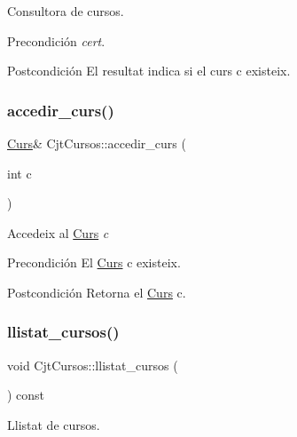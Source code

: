 Consultora de cursos. 

\begin{DoxyPrecond}{Precondición}
{\itshape cert}. 
\end{DoxyPrecond}
\begin{DoxyPostcond}{Postcondición}
El resultat indica si el curs c existeix. 
\end{DoxyPostcond}
\mbox{\label{class_cjt_cursos_aaff9556e6d0f2b55e74fb757ffd51e42}} 
\subsubsection{\texorpdfstring{accedir\+\_\+curs()}{accedir\_curs()}}
{\footnotesize\ttfamily \mbox{\hyperlink{class_curs}{Curs}}\& Cjt\+Cursos\+::accedir\+\_\+curs (\begin{DoxyParamCaption}\item[{int}]{c }\end{DoxyParamCaption})}



Accedeix al \mbox{\hyperlink{class_curs}{Curs}} {\itshape c} 

\begin{DoxyPrecond}{Precondición}
El \mbox{\hyperlink{class_curs}{Curs}} c existeix. 
\end{DoxyPrecond}
\begin{DoxyPostcond}{Postcondición}
Retorna el \mbox{\hyperlink{class_curs}{Curs}} c. 
\end{DoxyPostcond}
\mbox{\label{class_cjt_cursos_a9a772bfad772e507fa9b8f5194b13873}} 
\subsubsection{\texorpdfstring{llistat\+\_\+cursos()}{llistat\_cursos()}}
{\footnotesize\ttfamily void Cjt\+Cursos\+::llistat\+\_\+cursos (\begin{DoxyParamCaption}{ }\end{DoxyParamCaption}) const}



Llistat de cursos. 

